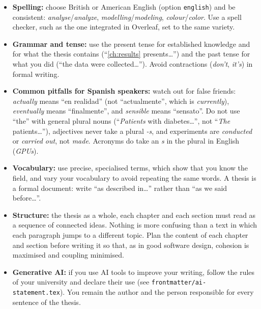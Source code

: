 \begin{itemize}
  \item \textbf{Spelling:} choose British or American English (option \texttt{english})
        and be consistent: \textit{analyse}/\textit{analyze},
        \textit{modelling}/\textit{modeling}, \textit{colour}/\textit{color}. Use a spell
        checker, such as the one integrated in Overleaf, set to the same variety.
  \item \textbf{Grammar and tense:} use the present tense for established knowledge and for
        what the thesis contains (\enquote{\autoref{ch:results} presents\dots}) and the past
        tense for what you did (\enquote{the data were collected\dots}). Avoid
        contractions (\textit{don't}, \textit{it's}) in formal writing.
  \item \textbf{Common pitfalls for Spanish speakers:} watch out for false friends:
        \textit{actually} means \enquote{en realidad} (not \enquote{actualmente}, which is
        \textit{currently}), \textit{eventually} means \enquote{finalmente}, and
        \textit{sensible} means \enquote{sensato}. Do not use \enquote{the} with general
        plural nouns (\enquote{\textit{Patients} with diabetes\dots}, not
        \enquote{\textit{The} patients\dots}), adjectives never take a plural \textit{-s},
        and experiments are \textit{conducted} or \textit{carried out}, not \textit{made}.
        Acronyms do take an \textit{s} in the plural in English (\textit{GPUs}).
  \item \textbf{Vocabulary:} use precise, specialised terms, which show that you know the
        field, and vary your vocabulary to avoid repeating the same words. A thesis is a
        formal document: write \enquote{as described in\dots} rather than \enquote{as we
        said before\dots}.
  \item \textbf{Structure:} the thesis as a whole, each chapter and each section must read
        as a sequence of connected ideas. Nothing is more confusing than a text in which
        each paragraph jumps to a different topic. Plan the content of each chapter and
        section before writing it so that, as in good software design, cohesion is
        maximised and coupling minimised.
  \item \textbf{Generative AI:} if you use AI tools to improve your writing, follow the
        rules of your university and declare their use (see
        \texttt{frontmatter/ai-statement.tex}). You remain the author and the person
        responsible for every sentence of the thesis.
\end{itemize}


